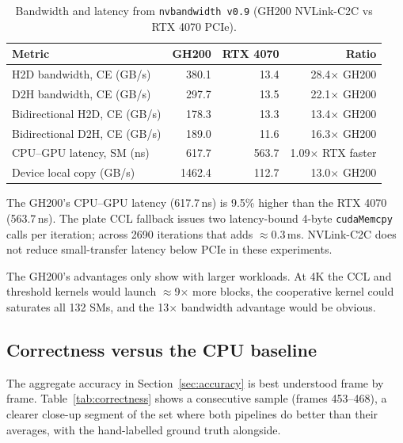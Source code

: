 \begin{table}[H]
\centering
\begin{tabular}{lrrr}
\toprule
Metric & GH200 & RTX 4070 & Ratio \\
\midrule
H2D bandwidth, CE (GB/s)      & 380.1  & 13.4  & 28.4$\times$ GH200 \\
D2H bandwidth, CE (GB/s)      & 297.7  & 13.5  & 22.1$\times$ GH200 \\
Bidirectional H2D, CE (GB/s)  & 178.3  & 13.3  & 13.4$\times$ GH200 \\
Bidirectional D2H, CE (GB/s)  & 189.0  & 11.6  & 16.3$\times$ GH200 \\
CPU--GPU latency, SM (ns)     & 617.7  & 563.7 & 1.09$\times$ RTX faster \\
Device local copy (GB/s)      & 1462.4 & 112.7 & 13.0$\times$ GH200 \\
\bottomrule
\end{tabular}
\caption{Bandwidth and latency from \texttt{nvbandwidth v0.9} (GH200 NVLink-C2C vs RTX 4070 PCIe).}
\label{tab:bandwidth}
\end{table}

The GH200's CPU--GPU latency (617.7\,ns) is 9.5\% higher than the RTX 4070 (563.7\,ns).
The plate CCL fallback issues two latency-bound 4-byte \texttt{cudaMemcpy} calls per iteration; across 2690 iterations that adds $\approx$0.3\,ms.
NVLink-C2C does not reduce small-transfer latency below PCIe in these experiments.

The GH200's advantages only show with larger workloads.
At 4K the CCL and threshold kernels would launch $\approx$9$\times$ more blocks, the cooperative kernel could saturates all 132 SMs, and the 13$\times$ bandwidth advantage would be obvious.

\subsection{Correctness versus the CPU baseline}
\label{sec:correctness}

The aggregate accuracy in Section~\ref{sec:accuracy} is best understood frame by frame.
Table~\ref{tab:correctness} shows a consecutive sample (frames 453--468), a clearer close-up segment of the set where both pipelines do better than their averages, with the hand-labelled ground truth alongside.

